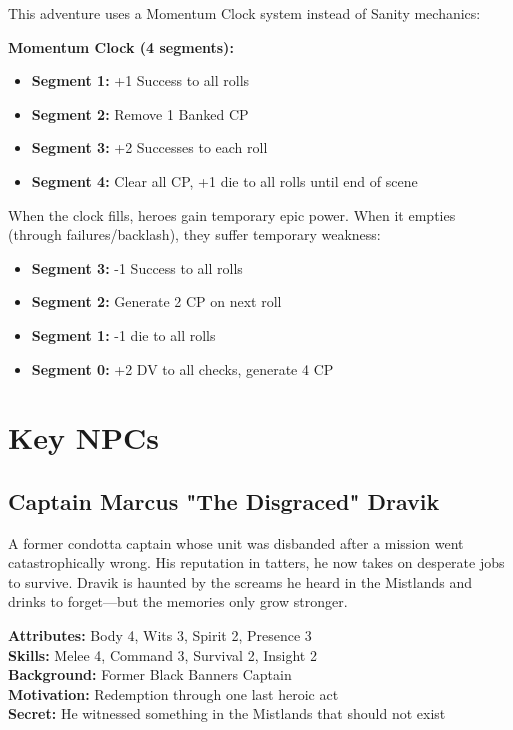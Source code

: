\documentclass[12pt,twoside]{article}
\begin{document}
This adventure uses a Momentum Clock system instead of Sanity mechanics:

\textbf{Momentum Clock (4 segments):}
\begin{itemize}
\item \textbf{Segment 1:} +1 Success to all rolls
\item \textbf{Segment 2:} Remove 1 Banked CP
\item \textbf{Segment 3:} +2 Successes to each roll
\item \textbf{Segment 4:} Clear all CP, +1 die to all rolls until end of scene
\end{itemize}

When the clock fills, heroes gain temporary epic power. When it empties (through failures/backlash), they suffer temporary weakness:
\begin{itemize}
\item \textbf{Segment 3:} -1 Success to all rolls
\item \textbf{Segment 2:} Generate 2 CP on next roll
\item \textbf{Segment 1:} -1 die to all rolls
\item \textbf{Segment 0:} +2 DV to all checks, generate 4 CP
\end{itemize}

\section{Key NPCs}

\subsection{Captain Marcus "The Disgraced" Dravik}

A former condotta captain whose unit was disbanded after a mission went catastrophically wrong. His reputation in tatters, he now takes on desperate jobs to survive. Dravik is haunted by the screams he heard in the Mistlands and drinks to forget—but the memories only grow stronger.

\textbf{Attributes:} Body 4, Wits 3, Spirit 2, Presence 3 \\
\textbf{Skills:} Melee 4, Command 3, Survival 2, Insight 2 \\
\textbf{Background:} Former Black Banners Captain \\
\textbf{Motivation:} Redemption through one last heroic act \\
\textbf{Secret:} He witnessed something in the Mistlands that should not exist
\end{document}
